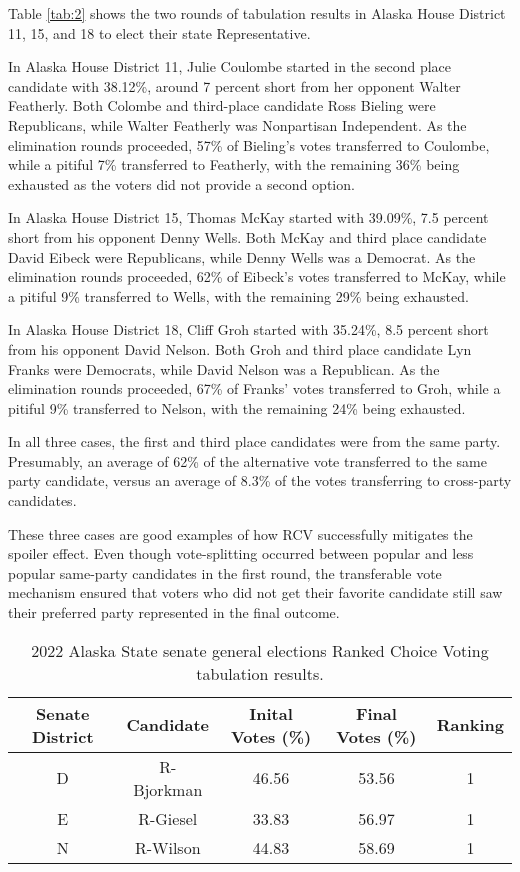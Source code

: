 Table \ref{tab:2} shows the two rounds of tabulation results in Alaska House District 11, 15, and 18 to elect their state Representative. 

In Alaska House District 11, Julie Coulombe started in the second place candidate with 38.12\%, around 7 percent short from her opponent Walter Featherly. Both Colombe and third-place candidate Ross Bieling were Republicans, while Walter Featherly was Nonpartisan Independent. As the elimination rounds proceeded, 57\% of Bieling’s votes transferred to Coulombe, while a pitiful 7\% transferred to Featherly, with the remaining 36\% being exhausted as the voters did not provide a second option. 

In Alaska House District 15, Thomas McKay started with 39.09\%, 7.5 percent short from his opponent Denny Wells. Both McKay and third place candidate David Eibeck were Republicans, while Denny Wells was a Democrat. As the elimination rounds proceeded, 62\% of Eibeck’s votes transferred to McKay, while a pitiful 9\% transferred to Wells, with the remaining 29\% being exhausted.

In Alaska House District 18, Cliff Groh started with 35.24\%, 8.5 percent short from his opponent David Nelson. Both Groh and third place candidate Lyn Franks were Democrats, while David Nelson was a Republican. As the elimination rounds proceeded, 67\% of Franks’ votes transferred to Groh, while a pitiful 9\% transferred to Nelson, with the remaining 24\% being exhausted. 

In all three cases, the first and third place candidates were from the same party. Presumably, an average of 62\% of the alternative vote transferred to the same party candidate, versus an average of 8.3\% of the votes transferring to cross-party candidates. 

These three cases are good examples of how RCV successfully mitigates the spoiler effect. Even though vote-splitting occurred between popular and less popular same-party candidates in the first round, the transferable vote mechanism ensured that voters who did not get their favorite candidate still saw their preferred party represented in the final outcome. 

\begin{table}
\centering
\begin{tabular}{|c|c|c|c|c|}
\hline
Senate District & Candidate & Inital Votes (\%) & Final Votes (\%) & Ranking \\ \hline
D & R-Bjorkman & 46.56 & 53.56 & 1 \\ \hline
E & R-Giesel & 33.83 & 56.97 & 1 \\ \hline
N & R-Wilson & 44.83 & 58.69 & 1 \\ \hline
\end{tabular}
\caption{2022 Alaska State senate general elections Ranked Choice Voting tabulation results.}
\label{tab:3}
\end{table}

